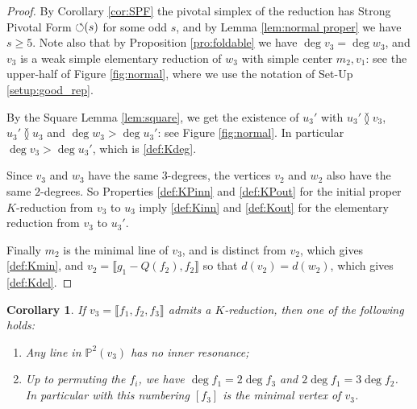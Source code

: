\documentclass[reqno,oneside,11pt]{amsart}
\theoremstyle{plain}
\newtheorem{corollary}[theorem]{Corollary}
\theoremstyle{definition}
\newcommand{\p}{\mathbb{P}}
\newcommand{\PF}{\text{$\circlearrowleft$\!\,}}
\renewcommand{\ne}{\between}
\newcommand{\llb}{\llbracket}
\newcommand{\rrb}{\rrbracket}
\newcommand{\lines}[1]{\p^2(#1)}
\renewcommand{\ge}{\geqslant}
\begin{document}
\begin{proof}
By Corollary \ref{cor:SPF} the pivotal simplex of the reduction has Strong Pivotal Form $\PF(s)$ for some odd $s$, and by Lemma \ref{lem:normal proper} we have $s \ge 5$.
Note also that by Proposition \ref{pro:foldable} we have $\deg v_3 = \deg w_3$,
and $v_3$ is a weak simple elementary reduction of $w_3$ with simple center
$m_2, v_1$: see the upper-half of Figure \ref{fig:normal}, where we use the
notation of Set-Up \ref{setup:good_rep}.

By the Square Lemma \ref{lem:square}, we get the existence of $u_3'$ with $u_3'
\ne v_3$, $u_3' \ne u_3$ and $\deg w_3 > \deg u_3'$: see Figure
\ref{fig:normal}.
In particular $\deg v_3 > \deg u_3'$, which is \ref{def:Kdeg}.

Since $v_3$ and $w_3$ have the same $3$-degrees, the vertices $v_2$ and $w_2$ also have the same $2$-degrees.
So Properties \ref{def:KPinn} and \ref{def:KPout} for the initial proper $K$-reduction from $v_3$ to $u_3$ imply \ref{def:Kinn} and \ref{def:Kout} for the elementary reduction from $v_3$ to $u_3'$.

Finally $m_2$ is the minimal line of $v_3$, and is distinct from $v_2$, which gives \ref{def:Kmin}, and
 $v_2 = \llb g_1 - Q(f_2), f_2 \rrb$ so that
$d(v_2) = d(w_2)$, which gives \ref{def:Kdel}.
\end{proof}

\begin{corollary} \label{cor:degree of K}
If $v_3 = \llb f_1, f_2, f_3 \rrb$ admits a $K$-reduction,
then one of the following holds:
\begin{enumerate}
\item \label{degreeK:case1} Any line in $\lines{v_3}$ has no inner resonance;
\item \label{degreeK:case2} Up to permuting the $f_i$, we have $\deg f_1 =
2\deg f_3$ and $2\deg f_1 = 3\deg f_2$.
In particular with this numbering $[f_3]$ is the minimal vertex of $v_3$.
\end{enumerate}
\end{corollary}
\end{document}
